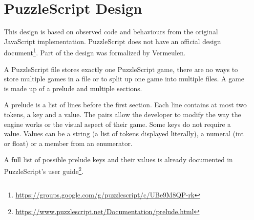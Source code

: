 \section{PuzzleScript Design}
\label{sec:puzzlescript}
This design is based on observed code and behaviours from the original JavaScript implementation. PuzzleScript does not have an official design document\footnote{\url{https://groups.google.com/g/puzzlescript/c/UBe9M8QP-rk}}. Part of the design was formalized by Vermeulen\cite{vermeulenautomated}.

A PuzzleScript file stores exactly one PuzzleScript game, there are no ways to store multiple games in a file or to split up one game into multiple files. A game is made up of a prelude and multiple sections.

A prelude is a list of lines before the first section. Each line contains at most two tokens, a key and a value. The pairs allow the developer to modify the way the engine works or the visual aspect of their game. Some keys do not require a value. Values can be a string (a list of tokens displayed literally), a numeral (int or float) or a member from an enumerator. 

A full list of possible prelude keys and their values is already documented in PuzzleScript's user guide\footnote{\url{https://www.puzzlescript.net/Documentation/prelude.html}}. 


